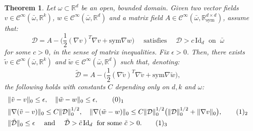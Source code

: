 \documentclass[reqno,twoside,11pt]{amsart}
\newcommand{\sym}{\mathrm{sym}}
\newcommand{\Id}{\mathrm{Id}}
\newcommand{\R}{\mathbb{R}}
\numberwithin{equation}{section}
\theoremstyle{plain}
\newtheorem{theorem}{Theorem}[section]
\theoremstyle{definition}
\begin{document}
\begin{theorem}\label{th_approx_nonlocal}
Let $\omega\subset\R^d$ be an open, bounded domain. Given
two vector fields $v\in\mathcal{C}^\infty(\bar\omega,\R^k)$, $w\in\mathcal{C}^\infty(\bar\omega,\R^d)$ and
a matrix field $A\in\mathcal{C}^\infty(\bar\omega,\R^{d\times d}_\sym)$, assume that:
$$\mathcal{D}=A-\big(\frac{1}{2}(\nabla v)^T\nabla v + \sym\nabla
w\big) \quad\mbox{ satisfies } \quad \mathcal{D}>c\,\Id_d \; \mbox{ on }
\; \bar\omega$$
for some $c>0$, in the sense of matrix inequalities. Fix
$\epsilon>0$. Then, there exists $\tilde v\in\mathcal{C}^\infty(\bar \omega,\R^k)$ and
$\tilde w\in\mathcal{C}^\infty(\bar\omega,\R^d)$ such that, denoting:
$$\tilde{\mathcal{D}}=A -\big(\frac{1}{2}(\nabla \tilde v)^T\nabla \tilde v + \sym\nabla \tilde w\big), $$
the following holds with constants $C$ depending only on $d, k$ and $\omega$:
\begin{align*}
& \|\tilde v - v\|_0\leq \epsilon, \quad \|\tilde w - w\|_0\leq \epsilon,
\tag*{(\theequation)$_1$}\refstepcounter{equation} \label{Cbound1}\vspace{1mm}\\ 
& \|\nabla (\tilde v-v)\|_0\leq C \|\mathcal{D}\|_0^{1/2}, \quad \|\nabla(\tilde w -
w)\|_0\leq C\|\mathcal{D}\|_0^{1/2}\big(\|\mathcal{D}\|_0^{1/2} +\|\nabla v\|_0\big),
\tag*{(\theequation)$_2$} \label{Cbound2}\vspace{1mm}\\
& \|\tilde{\mathcal{D}}\|_0\leq \epsilon\quad\mbox{ and } \quad
\tilde{\mathcal{D}}>\tilde c\,\Id_d \; \mbox{ for some $\tilde c>0$}. \tag*{(\theequation)$_3$} \label{Cbound3}
\end{align*}
\end{theorem}
\end{document}
